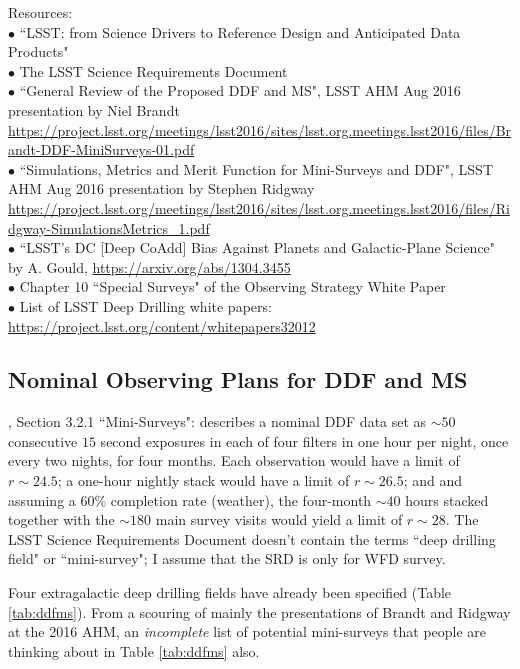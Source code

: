 \documentclass[DM,lsstdraft,toc]{lsstdoc}
\begin{document}
\noindent Resources: \\
$\bullet$ ``LSST: from Science Drivers to Reference Design and Anticipated Data Products" \cite{2008arXiv0805.2366I} \\
$\bullet$ The LSST Science Requirements Document \cite{LPM-17} \\
$\bullet$ ``General Review of the Proposed DDF and MS", LSST AHM Aug 2016 presentation by Niel Brandt \url{https://project.lsst.org/meetings/lsst2016/sites/lsst.org.meetings.lsst2016/files/Brandt-DDF-MiniSurveys-01.pdf} \\
$\bullet$ ``Simulations, Metrics and Merit Function for Mini-Surveys and DDF", LSST AHM Aug 2016 presentation by Stephen Ridgway \url{https://project.lsst.org/meetings/lsst2016/sites/lsst.org.meetings.lsst2016/files/Ridgway-SimulationsMetrics_1.pdf}\\
$\bullet$ ``LSST's DC [Deep CoAdd] Bias Against Planets and Galactic-Plane Science" by A. Gould, \cite{2013arXiv1304.3455G} \url{https://arxiv.org/abs/1304.3455} \\
$\bullet$ Chapter 10 ``Special Surveys" of the Observing Strategy White Paper \cite{OSWP} \\
$\bullet$ List of LSST Deep Drilling white papers: \url{https://project.lsst.org/content/whitepapers32012} \\


\subsection{Nominal Observing Plans for DDF and MS}\label{ssec:science_plans}

\cite{2008arXiv0805.2366I}, Section 3.2.1 ``Mini-Surveys": describes a nominal DDF data set as $\sim50$ consecutive $15$ second exposures in each of four filters in one hour per night, once every two nights, for four months. Each observation would have a limit of $r\sim24.5$; a one-hour nightly stack would have a limit of $r\sim26.5$; and and assuming a $60\%$ completion rate (weather), the four-month $\sim40$ hours stacked together with the $\sim180$ main survey visits would yield a limit of $r\sim28$. The LSST Science Requirements Document \cite{LPM-17} doesn't contain the terms ``deep drilling field" or ``mini-survey"; I assume that the SRD is only for WFD survey.

Four extragalactic deep drilling fields have already been specified (Table \ref{tab:ddfms}). From a scouring of mainly the presentations of Brandt and Ridgway at the 2016 AHM, an {\it incomplete} list of potential mini-surveys that people are thinking about in Table \ref{tab:ddfms} also.
\end{document}

